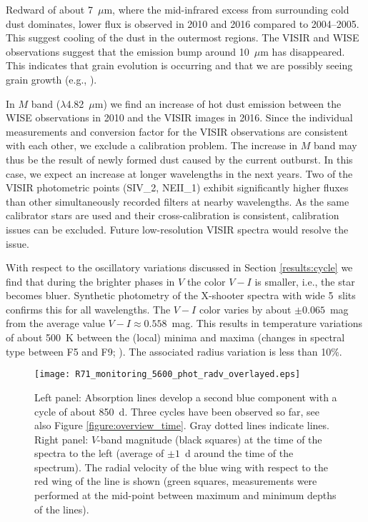 \documentclass[structabstract]{aa}
\begin{document}
Redward of about 7~$\mu$m, where the mid-infrared excess from surrounding cold dust dominates, lower flux is observed in 2010 and 2016 compared to 2004--2005. This suggest cooling of the dust in the outermost regions. The VISIR and WISE observations suggest that the emission bump around 10~$\mu$m has disappeared. This indicates that grain evolution is occurring and that we are possibly seeing grain growth (e.g., \citealt{2006ApJ...639..275K}).

In $M$ band ($\lambda$4.82~$\mu$m) we find an increase of hot dust emission between the WISE observations in 2010 and the VISIR images in 2016. Since the individual measurements and conversion factor for the VISIR observations are consistent with each other, we exclude a calibration problem. The increase in $M$ band may thus be the result of newly formed dust caused by the current outburst. In this case, we expect an increase at longer wavelengths in the next years. 
Two of the VISIR photometric points (SIV\_2, NEII\_1) exhibit significantly higher
fluxes than other simultaneously recorded filters at nearby wavelengths. As the same
calibrator stars are used and their cross-calibration is consistent, calibration issues can be excluded. Future low-resolution VISIR spectra would resolve the issue.

With respect to the oscillatory variations discussed in Section \ref{results:cycle} we find that during the brighter phases in $V$ the color $V-I$ is smaller, i.e., the star becomes bluer. Synthetic photometry of the X-shooter spectra with wide 5\arcsec\ slits confirms this for all wavelengths.  The $V-I$ color varies by about $\pm0.065$~mag from the average value $V-I \approx 0.558$~mag. This results in temperature variations of about 500~K between the (local) minima and maxima (changes in spectral type between F5 and F9; \citealt{2013ApJS..208....9P}). The associated radius variation is less than 10\%. 

 \begin{figure*}
\centering
\texttt{[image: R71\_monitoring\_5600\_phot\_radv\_overlayed.eps]}
     \caption{Left panel: Absorption lines develop a second blue component with a cycle of about 850~d. Three cycles have been observed so far, see also Figure \ref{figure:overview_time}. Gray dotted lines indicate  lines. Right panel: $V$-band magnitude (black squares) at the time of the spectra to the left (average of $\pm1$~d around the time of the spectrum). The radial velocity of the blue wing with respect to the red wing of the line is shown (green squares, measurements were performed at the mid-point between maximum and minimum depths of the lines).}
     \label{figure:overview}
\end{figure*}
\end{document}
